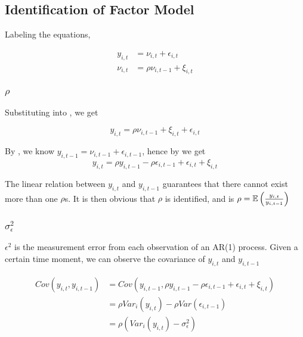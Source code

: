 \subsection{Identification of Factor Model}

Labeling the equations,

\begin{subequations}
    \begin{align}
        y_{i,t} &= \nu_{i,t} + \epsilon_{i,t} \label{eq:y-it} \\
        \nu_{i,t} &= \rho \nu_{i,t-1} + \xi_{i,t} \label{eq:nu-it}
    \end{align}
\end{subequations}

\subsubsection{$\rho$}

Substituting  into , we get 

\begin{equation}
    y_{i,t} = \rho \nu_{i,t-1} + \xi_{i,t}  + \epsilon_{i,t} \label{eq:y_t-1_nu}
\end{equation}

By , we know $y_{i,t-1} = \nu_{i,t-1} + \epsilon_{i,t-1}$, hence by  we get 
\begin{equation}
    y_{i,t} = \rho y_{i,t-1} - \rho \epsilon_{i,t-1} + \epsilon_{i,t} + \xi_{i,t}
\end{equation}

The linear relation between $y_{i,t}$ and $y_{i,t-1}$ guarantees that there cannot exist more than one $\rho$s. 
It is then obvious that $\rho$ is identified, and is $\rho = \operatorname{\mathbb{E}}\left(\frac{y_{i,t}}{y_{i,t-1}}\right)$

\subsubsection{$\sigma_\epsilon^2$}

$\epsilon^2$ is the measurement error from each observation of an AR(1) process. 
Given a certain time moment, we can observe the covariance of $y_{i,t}$ and $y_{i,t-1}$

\begin{align*}
    Cov(y_{i,t}, y_{i,t-1}) &= Cov( y_{i,t-1} , \rho y_{i,t-1} - \rho \epsilon_{i,t-1} + \epsilon_{i,t} + \xi_{i,t}) \\
    &= \rho Var_{i}(y_{i,t}) - \rho Var(\epsilon_{i,t-1}) \\
    &= \rho(Var_{i}(y_{i,t}) - \sigma_\epsilon^2)
\end{align*}


